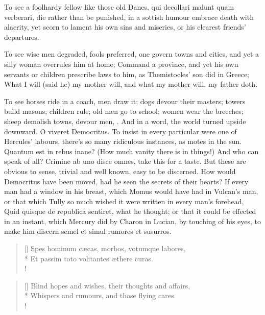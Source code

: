 {To see a foolhardy fellow like those old Danes, qui decollari malunt
quam verberari, die rather than be punished, in a sottish humour
embrace death with alacrity, yet scorn to lament his own sins and
miseries, or his clearest friends' departures.

To see wise men degraded, fools preferred, one govern towns and cities,
and yet a silly woman overrules him at home; Command a province,
and yet his own servants or children prescribe laws to him, as
Themistocles' son did in Greece; What I will (said he) my mother
will, and what my mother will, my father doth.

To see horses ride in a coach, men draw it; dogs devour their masters; towers build masons;
children rule; old men go to school; women wear the breeches;
sheep demolish towns, devour men, \etc{}. And in a word, the world
turned upside downward. O viveret Democritus.
To insist in every particular were one of Hercules' labours,
there's so many ridiculous instances, as motes in the sun. Quantum est
in rebus inane? (How much vanity there is in things!) And who can speak
of all? Crimine ab uno disce omnes, take this for a taste.
But these are obvious to sense, trivial and well known, easy to be
discerned. How would Democritus have been moved, had he seen the
secrets of their hearts? If every man had a window in his breast, which
Momus would have had in Vulcan's man, or that which Tully so much
wished it were written in every man's forehead, Quid quisque de
republica sentiret, what he thought; or that it could be effected in an
instant, which Mercury did by Charon in Lucian, by touching of his
eyes, to make him discern semel et simul rumores et susurros.

\begin{verse}[\versewidth]
Spes hominum c\ae{}cas, morbos, votumque labores,\\*
Et passim toto volitantes \ae{}there curas.\\!
\end{verse}

\settowidth{\versewidth}{Blind hopes and wishes, their thoughts and affairs,}
\begin{verse}[\versewidth]
Blind hopes and wishes, their thoughts and affairs,\\*
Whispers and rumours, and those flying cares.\\!
\end{verse}

}
